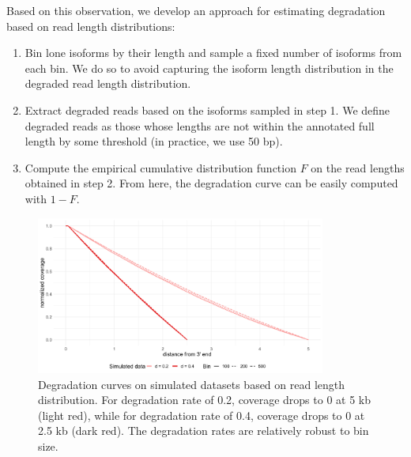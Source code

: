 Based on this observation, we develop an approach for estimating degradation based on read length distributions:
\begin{enumerate}
    \item Bin lone isoforms by their length and sample a fixed number of isoforms from each bin. We do so to avoid capturing the isoform length distribution in the degraded read length distribution.  
    \item Extract degraded reads based on the isoforms sampled in step 1. We define degraded reads as those whose lengths are not within the annotated full length by some threshold (in practice, we use 50 bp). 
    \item Compute the empirical cumulative distribution function $F$ on the read lengths obtained in step 2. From here, the degradation curve can be easily computed with $1-F$. 
\end{enumerate}

\begin{figure}[H]
    \centering
    \includegraphics[width=0.85\textwidth]{figures/sec-2-length-sim.png}
    \caption[Degradation curves on simulated datasets based on read length distribution]{Degradation curves on simulated datasets based on read length distribution. For degradation rate of 0.2, coverage drops to 0 at 5 kb (light red), while for degradation rate of 0.4, coverage drops to 0 at 2.5 kb (dark red). The degradation rates are relatively robust to bin size.}
    \label{fig:length-sim}
\end{figure}

